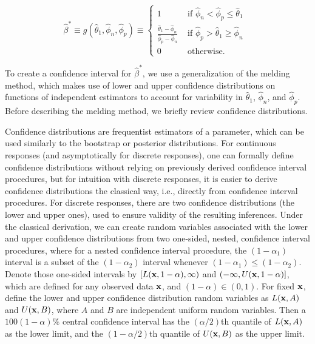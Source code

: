 \begin{equation}
\hat{\beta}^* \equiv
g(\hat{\theta}_1, \hat{\phi}_n, \hat{\phi}_p)
\equiv
\left\{
\begin{array}{ll}
1 & \mbox{ if $\hat{\phi}_n < \hat{\phi}_p \leq \hat{\theta}_1$ }  \\
\frac{\hat{\theta}_1 - \hat{\phi}_n}{\hat{\phi}_p - \hat{\phi}_n} &
\mbox{ if $\hat{\phi}_p > \hat{\theta}_1 \geq \hat{\phi}_n$ } \\
0 & \mbox{ otherwise.}
\end{array}
\right.
\label{eq:srs-beta-est}
\end{equation}



To create a confidence interval for \( \hat{\beta}^* \), we use a generalization of the melding method, \cite{FayP:2015} which makes use of lower and upper confidence distributions on functions of independent estimators to account for variability in \( \hat{\theta}_1 \), \( \hat{\phi}_n \), and \( \hat{\phi}_p \).
Before describing the melding method, we briefly review confidence distributions.

Confidence distributions are frequentist estimators of a parameter, which can be used similarly to the bootstrap or posterior distributions.
For continuous responses (and asymptotically for discrete responses), one can formally define confidence distributions without relying on previously derived confidence interval procedures,\cite{Xie2013} but for intuition with discrete responses, it is easier to derive confidence distributions the classical way, i.e., directly from confidence interval procedures.
For discrete responses, there are two confidence distributions (the lower and upper ones), used to ensure validity of the resulting inferences.
Under the classical derivation, we can create random variables associated with the lower and upper confidence distributions from two one-sided, nested, confidence interval procedures, where for a nested confidence interval procedure, the $(1-\alpha_1)$ interval is a subset of the $(1-\alpha_2)$ interval whenever $(1-\alpha_1) \leq (1-\alpha_2)$.
Denote those one-sided intervals by $[L({\bf x},1-\alpha), \infty)$ and $(-\infty, U({\bf x},1-\alpha)]$, which are defined for any observed data ${\bf x}$, and $(1-\alpha) \in (0,1)$.
For fixed ${\bf x}$, define the lower and upper confidence distribution random variables as $L({\bf x}, A)$ and $U({\bf x},B)$, where $A$ and $B$ are independent uniform random variables.
Then a $100(1-\alpha)\%$ central confidence interval has the $(\alpha/2)$th quantile of $L({\bf x}, A)$ as the lower limit, and the $(1-\alpha/2)$th quantile of $U({\bf x},B)$ as the upper limit.

